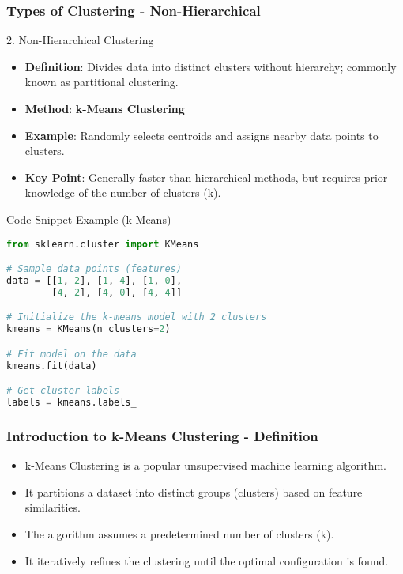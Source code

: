 \documentclass[aspectratio=169]{beamer}
\begin{document}
\begin{frame}[fragile]
    \frametitle{Types of Clustering - Non-Hierarchical}
    \begin{block}{2. Non-Hierarchical Clustering}
        \begin{itemize}
            \item \textbf{Definition}: Divides data into distinct clusters without hierarchy; commonly known as partitional clustering.
            \item \textbf{Method}: \textbf{k-Means Clustering}
            \item \textbf{Example}: Randomly selects centroids and assigns nearby data points to clusters.
            \item \textbf{Key Point}: Generally faster than hierarchical methods, but requires prior knowledge of the number of clusters (k).
        \end{itemize}
    \end{block}

    \begin{block}{Code Snippet Example (k-Means)}
        \begin{lstlisting}[language=Python]
from sklearn.cluster import KMeans

# Sample data points (features)
data = [[1, 2], [1, 4], [1, 0], 
        [4, 2], [4, 0], [4, 4]]

# Initialize the k-means model with 2 clusters
kmeans = KMeans(n_clusters=2)

# Fit model on the data
kmeans.fit(data)

# Get cluster labels
labels = kmeans.labels_
        \end{lstlisting}
    \end{block}
\end{frame}

\begin{frame}[fragile]
    \frametitle{Introduction to k-Means Clustering - Definition}
    \begin{itemize}
        \item k-Means Clustering is a popular unsupervised machine learning algorithm.
        \item It partitions a dataset into distinct groups (clusters) based on feature similarities.
        \item The algorithm assumes a predetermined number of clusters (k).
        \item It iteratively refines the clustering until the optimal configuration is found.
    \end{itemize}
\end{frame}
\end{document}
